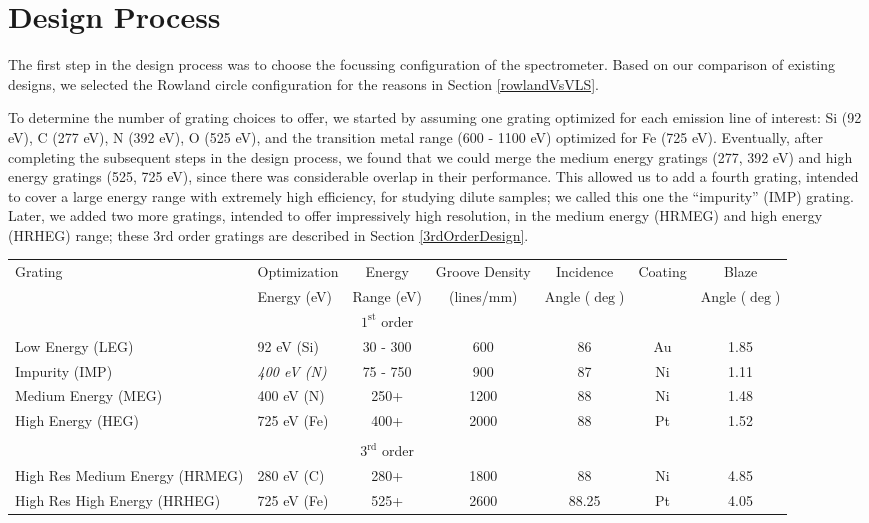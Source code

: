 \section{Design Process}
The first step in the design process was to choose the focussing configuration of the spectrometer.  Based on our comparison of existing designs, we selected the Rowland circle configuration for the reasons in Section \ref{rowlandVsVLS}.

To determine the number of grating choices to offer, we started by assuming one grating optimized for each emission line of interest: Si (92 eV), C (277 eV), N (392 eV), O (525 eV), and the transition metal range (600 - 1100 eV) optimized for Fe (725 eV).  Eventually, after completing the subsequent steps in the design process, we found that we could merge the medium energy gratings (277, 392 eV) and high energy gratings (525, 725 eV), since there was considerable overlap in their performance.  This allowed us to add a fourth grating, intended to cover a large energy range with extremely high efficiency, for studying dilute samples; we called this one the ``impurity'' (IMP) grating.  Later, we added two more gratings, intended to offer impressively high resolution, in the medium energy (HRMEG) and high energy (HRHEG) range; these 3rd order gratings are described in Section \ref{3rdOrderDesign}.

\renewcommand{\arraystretch}{1.3}
\begin{table}[h]
   \centering
   {\footnotesize
 \begin{tabular}{@{} llccccc@{}} %
\toprule
        Grating    & Optimization& Energy& Groove Density & Incidence & Coating & Blaze\\
        & Energy (eV) & Range (eV) & (lines/mm) & Angle ($\deg$) & &Angle ($\deg$)\\
\toprule
      &&$1^\textrm{st}$ order&&&&\\
\midrule
Low Energy (LEG) & 92 eV (Si) & 30 - 300&600&86&Au&1.85\\
Impurity (IMP) & \emph{400 eV (N)} & 75 - 750&900&87&Ni&1.11\\
Medium Energy (MEG) & 400 eV (N) & 250+&1200&88&Ni&1.48\\
High Energy (HEG) & 725 eV (Fe) & 400+&2000&88&Pt&1.52\\
&&&&&&\\
\toprule
 & &$3^\textrm{rd}$ order&&&&\\
\midrule
High Res Medium Energy (HRMEG) & 280 eV (C) & 280+&1800&88&Ni&4.85\\
High Res High Energy (HRHEG) & 725 eV (Fe) & 525+&2600&88.25&Pt&4.05\\
\bottomrule
   \end{tabular}
   }
   \label{gratings-table}
\end{table}
\renewcommand{\arraystretch}{1.2}

